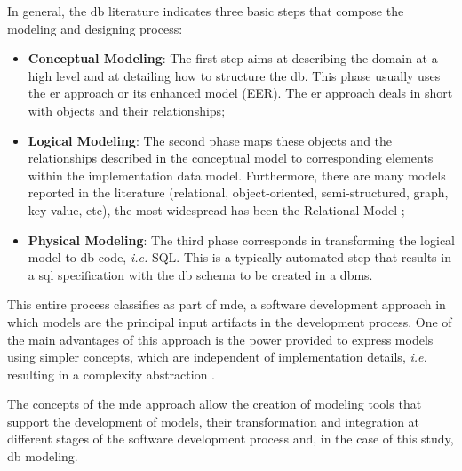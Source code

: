 In general, the \ac{db} literature indicates three basic steps that compose the modeling and designing process:
\begin{itemize}
    \item \textbf{Conceptual Modeling}: The first step aims at describing the domain at a high level and at detailing how to structure the \ac{db}.
    This phase usually uses the \ac{er} approach or its enhanced model (EER).
    The \ac{er} approach deals in short with objects and their relationships;
    
    \item \textbf{Logical Modeling}: The second phase maps these objects and the relationships described in the conceptual model to corresponding elements within the implementation data model.
    Furthermore, there are many models reported in the literature (relational, object-oriented, semi-structured, graph, key-value, etc), the most widespread has been the Relational Model \cite{Codd:1989, Karanikolas:2011, Paredaens:2012, Robinson:2015, Puangsaijai:2017};

    \item \textbf{Physical Modeling}: The third phase corresponds in transforming the logical model to \ac{db} code, \textit{i.e.} SQL.
This is a typically automated step that results in a \ac{sql} specification with the \ac{db} schema to be created in a \ac{dbms}.
\end{itemize}


This entire process classifies as part of \ac{mde}, a software development approach in which models are the principal input artifacts in the development process.
One of the main advantages of this approach is the power provided to express models using simpler concepts, which are independent of implementation details, \textit{i.e.} resulting in a complexity abstraction \cite{Brambilla:2017}.

The concepts of the \ac{mde} approach allow the creation of modeling tools that support the development of models, their transformation and integration at different stages of the software development process and, in the case of this study, \ac{db} modeling.


